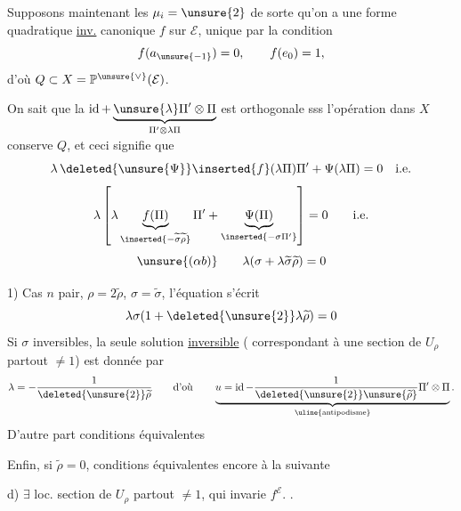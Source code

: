 Supposons maintenant les $\mu_i=\unsure{2}$ de sorte qu'on a une forme quadratique
\uline{inv.} canonique $f$ sur $\mathcal E$, unique par la condition
\[
f(a_{\unsure{-1}})=0,\qquad f(e_0)=1,
\]
d'où $Q\subset X=\mathbb P^{\unsure{\vee}}(\mathcal E)$.

On sait que la 
$\operatorname{id}+\underbrace{\unsure{\lambda}\Pi'\otimes\Pi}_{\Pi'\otimes\lambda\Pi}$
est  orthogonale sss l'opération 
dans $X$ conserve $Q$, et ceci signifie que
\[
\lambda\,\deleted{\unsure{\Psi}}\inserted{f}(\lambda\Pi)\Pi'
+\Psi(\lambda\Pi)=0\quad\text{i.e.}
\]
\[
\lambda\left[
\lambda\underbrace{f(\Pi)}_{\inserted{-\widetilde\sigma\widetilde\rho}}\Pi'
+\underbrace{\Psi(\Pi)}_{\inserted{-\sigma\Pi'}}
\right]=0\qquad\text{i.e.}
\]
\[
\unsure{(\alpha b)}\qquad
\lambda(\sigma+\lambda\widetilde\sigma\widetilde\rho)=0
\]

1) Cas $n$ pair, $\rho=2\widetilde\rho$, $\sigma=\widetilde\sigma$, l'équation s'écrit
\[
\lambda\sigma(1+\deleted{\unsure{2}}\lambda\widetilde\rho)=0
\]
Si $\sigma$  inversibles,
la seule solution \uline{inversible}
( correspondant à une section de $U_\rho$ partout $\ne1$)
est donnée par
\[
\lambda=-\frac{1}{\deleted{\unsure{2}}\widetilde\rho}
\qquad\text{d'où}\qquad
\underbrace{u=\operatorname{id}-\frac{1}{\deleted{\unsure{2}}\unsure{\widetilde\rho}}\Pi'\otimes\Pi}
_{\uline{\text{antipodisme}}}.
\]
D'autre part conditions équivalentes

Enfin, si $\widetilde\rho=0$,  conditions équivalentes encore à la suivante

d) $\exists$ loc. section  de $U_\rho$ partout
$\ne1$, qui invarie $f^{\mathcal E}$.
.

